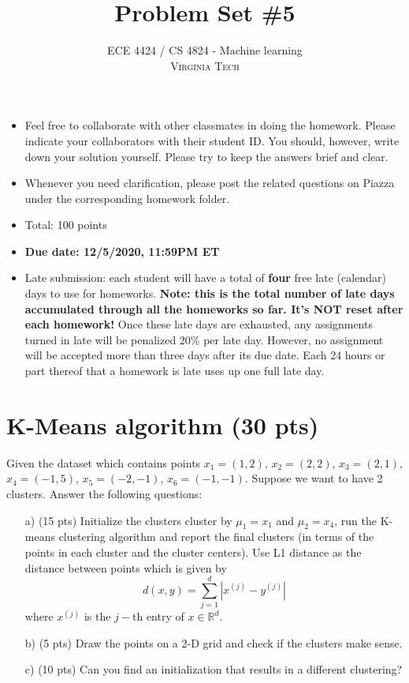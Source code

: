 \documentclass[12pt]{article}
\title{Problem Set \#5} %
\author{ECE 4424 / CS 4824 - Machine learning\\ %
\textsc{Virginia Tech}
}
\begin{document}


\setlength{\droptitle}{-5em}    
\maketitle


\begin{itemize}
    \item Feel free to collaborate with other classmates in doing the homework. Please indicate your collaborators with their student ID. You should, however, write down your solution yourself. Please try to keep the answers brief and clear.
    \item Whenever you need clarification, please post the related questions on Piazza under the corresponding homework folder.
    \item Total: 100 points
    \item \textbf{Due date: 12/5/2020, 11:59PM ET}
    \item Late submission: each student will have a total of \textbf{four} free late (calendar) days to use for homeworks. \textbf{Note: this is the total number of late days accumulated through all the homeworks so far. It's NOT reset after each homework!} Once these late days are exhausted, any assignments turned in late will be penalized 20\% per late day. However, no assignment will be accepted more than three days after its due date. Each 24 hours or part thereof that a homework is late uses up one full late day. 
\end{itemize}



\section{K-Means algorithm (30 pts)}
\label{sec:perceptron}

Given the dataset which contains points $x_1 = (1,2)$, $x_2 = (2,2)$,  $x_3 = (2, 1)$, $x_4 = (-1, 5)$, $x_5= (-2, -1)$, $x_6 = (-1,-1)$. Suppose we want to have 2 clusters. Answer the following questions:
\begin{itemize}
    \item[a)] (15 pts) Initialize the clusters cluster by $\mu_1=x_1$  and $\mu_2=x_4$, run the K-means clustering algorithm and report the final clusters (in terms of the points in each cluster and the cluster centers). Use L1 distance as the distance between points which is given by
    \begin{equation*}
        d(x,y) = \sum_{j=1}^d |x^{(j)}-y^{(j)}|
    \end{equation*}
    where $x^{(j)}$ is the $j-$th entry of $x\in\mathbb{R}^d$.
    \item[b)] (5 pts)  Draw the points on a 2-D grid and check if the clusters make sense.
    \item[c)] (10 pts) Can you find an initialization that results in a different clustering?
\end{itemize}
\end{document}

